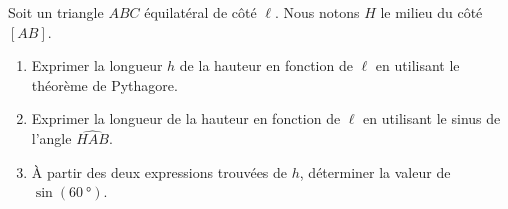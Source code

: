 
\begin{exercice}\label{exosmath-0444}

    Soit un triangle \( ABC\) équilatéral de côté \( \ell\). Nous notons \( H\) le milieu du côté \( [AB]\).
    \begin{enumerate}
        \item
            Exprimer la longueur \( h\) de la hauteur en fonction de \( \ell\) en utilisant le théorème de Pythagore.
        \item
            Exprimer la longueur de la hauteur en fonction de \( \ell\) en utilisant le sinus de l'angle \( \widehat{HAB}\).
        \item
            À partir des deux expressions trouvées de \( h\), déterminer la valeur de \( \sin( \SI{60}{\degree}  )\).
    \end{enumerate}

\end{exercice}
